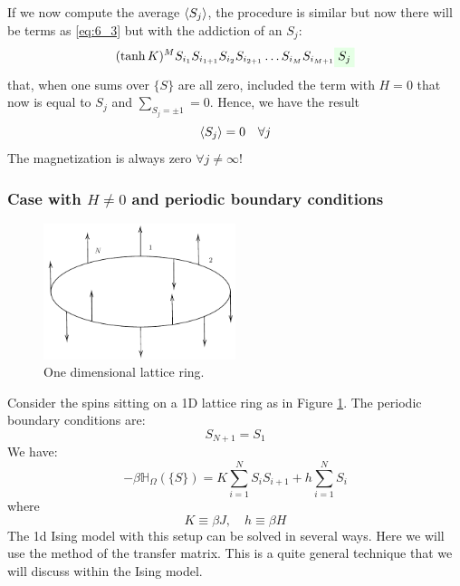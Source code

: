 \documentclass[../main/main.tex]{subfiles}
\begin{document}
 If we now compute the average \( \expval{S_j}  \), the procedure is similar but now there will be terms as \eqref{eq:6_3} but with the addiction of an \( S_j \):
\begin{equation}
  (\tanh K)^M S_{i_1} S_{i_{1+1}} S_{i_2} S_{i_{2+1}} \dots S_{i_M} S_{i_{M+1}} \mathcolorbox{green!10}{S_j}
\end{equation}
that, when one sums over \( \{ S \}   \) are all zero, included the term with \( H=0 \) that now is equal to \( S_j \) and \( \sum_{S_j = \pm 1}^{} = 0   \). Hence, we have the result
\begin{equation}
  \expval{S_j} = 0 \quad \forall j
\end{equation}
The magnetization is always zero \( \forall j \neq \infty  \)!


\subsubsection{Case with \( H\neq0 \) and periodic boundary conditions}
\begin{figure}[h!]
\centering
\includegraphics[width=0.5\textwidth]{../lessons/6_image/4.pdf}
\caption{\label{fig:6_4} One dimensional lattice ring.}
\end{figure}
Consider the spins sitting on a 1D lattice ring as in Figure \ref{fig:6_4}. The periodic boundary conditions are:
\begin{equation}
  S_{N+1}=S_1
\end{equation}
We have:
\begin{equation}
  -\beta \mathbb{H}_ \Omega  ( \{ S \}  ) = K \sum_{i=1}^{N} S_i S_{i+1} + h \sum_{i=1}^{N} S_i
\end{equation}
where
\begin{equation}
   K \equiv \beta J,  \quad h \equiv \beta H
\end{equation}
The 1d Ising model with this setup can be solved in several ways. Here we will use the method of the transfer matrix. This is a quite general technique that we will discuss within the Ising model.
\end{document}
